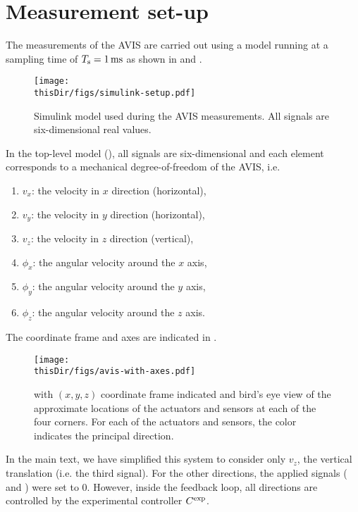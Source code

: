 
\section{ Measurement set-up}
\label{app:avis-setup}
The measurements of the \gls{AVIS} are carried out using a \Simulink model running at a sampling time of $T_{\mathrm{s}} = 1\,\mathrm{ms}$ as shown in  and .

\begin{figure}
\setlength\figurewidth{\columnwidth}
  \texttt{[image: \\thisDir/figs/simulink-setup.pdf]}
  \caption{Simulink model used during the AVIS measurements. All signals are six-dimensional real values.}
  \label{fig:avis:simulink:setup}
\end{figure}

In the top-level model (), all signals are six-dimensional and each element corresponds to a mechanical degree-of-freedom of the \gls{AVIS}, i.e. 
\begin{enumerate}
  \item $v_x$: the velocity in $x$ direction (horizontal),
  \item $v_y$: the velocity in $y$ direction (horizontal),
  \item $v_z$: the velocity in $z$ direction (vertical),
  \item $\phi_x$: the angular velocity around the $x$ axis,
  \item $\phi_y$: the angular velocity around the $y$ axis,
  \item $\phi_z$: the angular velocity around the $z$ axis.
\end{enumerate}
The coordinate frame and axes are indicated in .

\begin{figure}
  \centering
  \texttt{[image: \\thisDir/figs/avis-with-axes.pdf]}
  \caption{ with $(x,y,z)$ coordinate frame indicated and bird's eye view of the approximate locations of the actuators and sensors at each of the four corners. For each of the actuators and sensors, the color indicates the principal direction.}
  \label{fig:avis:withAxes}
\end{figure}

In the main text, we have simplified this system to consider only $v_z$, the vertical translation (i.e. the third signal).
For the other directions, the applied signals ( and ) were set to $0$.
However, inside the feedback loop, all directions are controlled by the experimental controller $C^{\mathrm{exp}}$.

